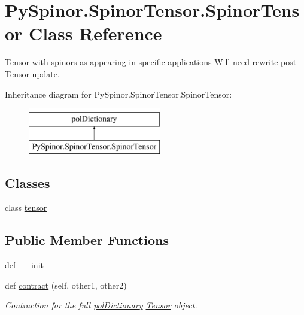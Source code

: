 \hypertarget{class_py_spinor_1_1_spinor_tensor_1_1_spinor_tensor}{}\section{Py\+Spinor.\+Spinor\+Tensor.\+Spinor\+Tensor Class Reference}
\label{class_py_spinor_1_1_spinor_tensor_1_1_spinor_tensor}


\hyperlink{namespace_py_spinor_1_1_tensor}{Tensor} with spinors as appearing in specific applications Will need rewrite post \hyperlink{namespace_py_spinor_1_1_tensor}{Tensor} update.  


Inheritance diagram for Py\+Spinor.\+Spinor\+Tensor.\+Spinor\+Tensor\+:\begin{figure}[H]
\begin{center}
\leavevmode
\includegraphics[height=2.000000cm]{class_py_spinor_1_1_spinor_tensor_1_1_spinor_tensor}
\end{center}
\end{figure}
\subsection*{Classes}
\begin{DoxyCompactItemize}
\item 
class \hyperlink{class_py_spinor_1_1_spinor_tensor_1_1_spinor_tensor_1_1tensor}{tensor}
\end{DoxyCompactItemize}
\subsection*{Public Member Functions}
\begin{DoxyCompactItemize}
\item 
def \hyperlink{class_py_spinor_1_1_spinor_tensor_1_1_spinor_tensor_ad1bfc424fc8b77321c2d0514c5645423}{\+\_\+\+\_\+init\+\_\+\+\_\+}
\item 
def \hyperlink{class_py_spinor_1_1_spinor_tensor_1_1_spinor_tensor_a7f52ba9bc232e7274e5d2440fec9b4fb}{contract} (self, other1, other2)
\begin{DoxyCompactList}\small\item\em Contraction for the full \hyperlink{namespace_py_spinor_1_1pol_dictionary}{pol\+Dictionary} \hyperlink{namespace_py_spinor_1_1_tensor}{Tensor} object. \end{DoxyCompactList}\end{DoxyCompactItemize}

